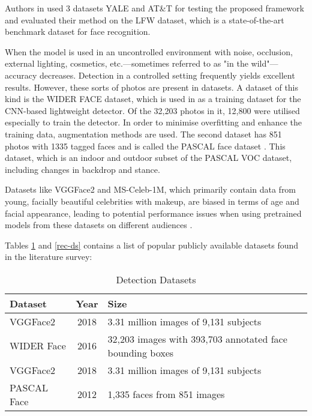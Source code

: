 Authors in \cite{abuzneid_enhanced_2018} used 3 datasets YALE and AT\&T for testing the proposed framework and evaluated their method on the LFW dataset, which is a state-of-the-art benchmark dataset for face recognition.

When the model is used in an uncontrolled environment with noise, occlusion, external lighting, cosmetics, etc.—sometimes referred to as "in the wild"—accuracy decreases. Detection in a controlled setting frequently yields excellent results. However, these sorts of photos are present in datasets. A dataset of this kind is the WIDER FACE dataset, which is used in \cite{putro_high_2021} as a training dataset for the CNN-based lightweight detector. Of the 32,203 photos in it, 12,800 were utilised especially to train the detector. In order to minimise overfitting and enhance the training data, augmentation methods are used. The second dataset has 851 photos with 1335 tagged faces and is called the PASCAL face dataset \cite{putro_high_2021}. This dataset, which is an indoor and outdoor subset of the PASCAL VOC dataset, including changes in backdrop and stance.

Datasets like VGGFace2 and MS-Celeb-1M, which primarily contain data from young, facially beautiful celebrities with makeup, are biased in terms of age and facial appearance, leading to potential performance issues when using pretrained models from these datasets on different audiences \cite{wanyonyi_open-source_2022}.

Tables \ref{det-ds} and \ref{rec-ds} contains a list of popular publicly available datasets found in the literature survey:

\begin{table}[htbp]
\caption{Detection Datasets}
\begin{center}
\begin{tabularx}{\columnwidth}{|X|c|X|}
\hline
\textbf{Dataset} & \textbf{Year}& \textbf{Size} \\
\hline
VGGFace2 \cite{kim_face_2022} & 2018 & 3.31 million images of 9,131 subjects \\
\hline
WIDER Face \cite{kim_face_2022} & 2016 & 32,203 images with 393,703 annotated face bounding boxes \\
\hline
VGGFace2 \cite{kim_face_2022} & 2018 & 3.31 million images of 9,131 subjects \\
\hline
PASCAL Face \cite{feng_detect_2022} & 2012 & 1,335 faces from 851 images \\
\hline
\end{tabularx}
\label{det-ds}
\end{center}
\end{table}
    
